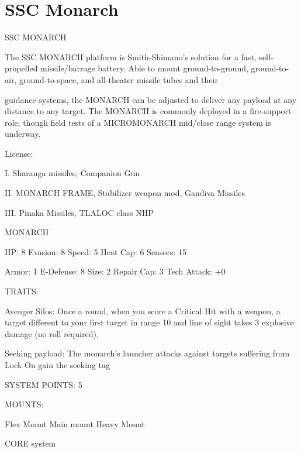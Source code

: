 \section{SSC Monarch}

                                             SSC MONARCH

The SSC MONARCH platform is Smith-Shimano’s solution for a fast, self-propelled missile/barrage battery.
Able to mount ground-to-ground, ground-to-air, ground-to-space, and all-theater missile tubes and their

guidance systems, the MONARCH can be adjusted to deliver any payload at any distance to any target.
The MONARCH is commonly deployed in a fire-support role, though field tests of a MICROMONARCH
mid/close range system is underway.

                                                     License:

I. Sharanga missiles, Companion Gun

II. MONARCH FRAME, Stabilizer weapon mod, Gandiva Missiles

III. Pinaka Missiles, TLALOC class NHP


                                                    MONARCH

  HP: 8           Evasion: 8                             Speed: 5            Heat Cap: 6         Sensors: 15

  Armor: 1        E-Defense: 8                           Size: 2             Repair Cap: 3       Tech Attack:
                                                                                                 +0

                                                      TRAITS:

  Avenger Silos: Once a round, when you score a Critical Hit with a weapon, a target different to your
  first target in range 10 and line of sight takes 3 explosive damage (no roll required).

  Seeking payload: The monarch’s launcher attacks against targets suffering from Lock On gain the
  seeking tag

                                               SYSTEM POINTS: 5

                                                     MOUNTS:

   Flex Mount                         Main mount                             Heavy Mount

                                                   CORE system

